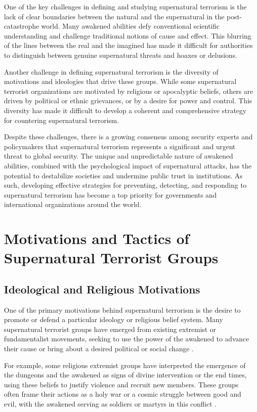 \documentclass[12pt, a4paper]{article}
\begin{document}
One of the key challenges in defining and studying supernatural terrorism is the lack of clear boundaries between the natural and the supernatural in the post-catastrophe world. Many awakened abilities defy conventional scientific understanding and challenge traditional notions of cause and effect. This blurring of the lines between the real and the imagined has made it difficult for authorities to distinguish between genuine supernatural threats and hoaxes or delusions.

Another challenge in defining supernatural terrorism is the diversity of motivations and ideologies that drive these groups. While some supernatural terrorist organizations are motivated by religious or apocalyptic beliefs, others are driven by political or ethnic grievances, or by a desire for power and control. This diversity has made it difficult to develop a coherent and comprehensive strategy for countering supernatural terrorism.

Despite these challenges, there is a growing consensus among security experts and policymakers that supernatural terrorism represents a significant and urgent threat to global security. The unique and unpredictable nature of awakened abilities, combined with the psychological impact of supernatural attacks, has the potential to destabilize societies and undermine public trust in institutions. As such, developing effective strategies for preventing, detecting, and responding to supernatural terrorism has become a top priority for governments and international organizations around the world.

\section{Motivations and Tactics of Supernatural Terrorist Groups}
\subsection{Ideological and Religious Motivations}
One of the primary motivations behind supernatural terrorism is the desire to promote or defend a particular ideology or religious belief system. Many supernatural terrorist groups have emerged from existing extremist or fundamentalist movements, seeking to use the power of the awakened to advance their cause or bring about a desired political or social change \citep{Nakamura2027}.

For example, some religious extremist groups have interpreted the emergence of the dungeons and the awakened as signs of divine intervention or the end times, using these beliefs to justify violence and recruit new members. These groups often frame their actions as a holy war or a cosmic struggle between good and evil, with the awakened serving as soldiers or martyrs in this conflict \citep{Hoffman2026}.
\end{document}
